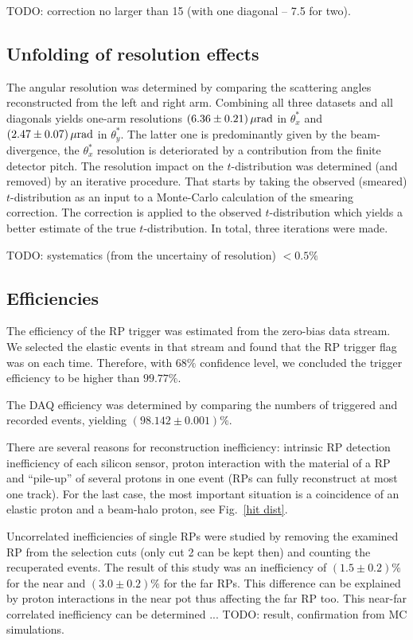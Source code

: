 \documentclass[doublecol]{../macros/epl2}
\def\un#1{\,{\rm #1}}
\begin{document}
TODO: correction no larger than 15 (with one diagonal -- 7.5 for two).

\subsection{Unfolding of resolution effects}

The angular resolution was determined by comparing the scattering angles reconstructed from the left and right arm. Combining all three datasets and all diagonals yields one-arm resolutions $(6.36\pm 0.21)\un{\mu rad}$ in $\theta^*_x$ and $(2.47\pm 0.07)\un{\mu rad}$ in $\theta^*_y$. The latter one is predominantly given by the beam-divergence, the $\theta^*_x$ resolution is deteriorated by a contribution from the finite detector pitch. The resolution impact on the $t$-distribution was determined (and removed) by an iterative procedure. That starts by taking the observed (smeared) $t$-distribution as an input to a Monte-Carlo calculation of the smearing correction. The correction is applied to the observed $t$-distribution which yields a better estimate of the true $t$-distribution. In total, three iterations were made.

TODO: systematics (from the uncertainy of resolution) $< 0.5\%$

\subsection{Efficiencies}

The efficiency of the RP trigger was estimated from the zero-bias data stream. We selected the elastic events in that stream and found that the RP trigger flag was on each time. Therefore, with $68\%$ confidence level, we concluded the trigger efficiency to be higher than $99.77\%$.

The DAQ efficiency was determined by comparing the numbers of triggered and recorded events, yielding $(98.142 \pm 0.001)\%$.

There are several reasons for reconstruction inefficiency: intrinsic RP detection inefficiency of each silicon sensor, proton interaction with the material of a RP and ``pile-up'' of several protons in one event (RPs can fully reconstruct at most one track). For the last case, the most important situation is a coincidence of an elastic proton and a beam-halo proton, see Fig.~\ref{hit dist}.

Uncorrelated inefficiencies of single RPs were studied by removing the examined RP from the selection cuts (only cut 2 can be kept then) and counting the recuperated events. The result of this study was an inefficiency of $(1.5 \pm 0.2)\%$ for the near and $(3.0 \pm 0.2)\%$ for the far RPs. This difference can be explained by proton interactions in the near pot thus affecting the far RP too. This near-far correlated inefficiency can be determined ... TODO: result, confirmation from MC simulations.
\end{document}
